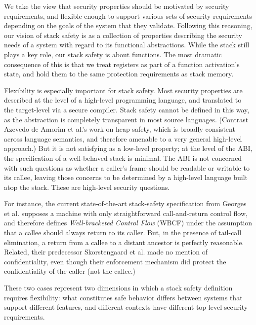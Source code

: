 \documentclass[10pt,conference]{ieeetran}%
\theoremstyle{definition}
\begin{document}
We take the view that security properties should be motivated by security requirements,
and flexible enough to support various sets of security requirements depending on the
goals of the system that they validate.
Following this reasoning, our vision of stack safety is as a collection of properties
describing the security needs of a system with regard to its functional abstractions.
While the stack still plays a key role, our stack safety is about functions. The most
dramatic consequence of this is that we treat registers as part of a function activation's
state, and hold them to the same protection requirements as stack memory.

Flexibility is especially important for stack safety.
%
Most security properties are described at the level of a high-level programming language,
and translated to the target-level via a secure compiler. Stack safety cannot
be defined in this way, as the abstraction is completely transparent in most source languages.
(Contrast Azevedo de Amorim et al.'s \cite{DBLP:conf/post/AmorimHP18} work on heap safety,
which is broadly consistent across language semantics, and therefore
amenable to a very general high-level approach.)
%
But it is not satisfying as a low-level property; at the level of the ABI, the
specification of a well-behaved stack is minimal. The ABI is not concerned with such
questions as whether a caller's frame should be readable or writable to its callee,
leaving those concerns to be determined by a high-level language built atop the stack.
These are high-level security questions.

For instance, the current state-of-the-art stack-safety specification from Georges et al.
\cite{Georges22:TempsDesCerises} supposes a machine with only straightforward call-and-return
control flow, and therefore defines {\em Well-bracketed Control Flow} (WBCF) under the assumption that
a callee should always return to its caller. But, in the presence of tail-call elimination, a
return from a callee to a distant ancestor is perfectly reasonable. Related, their predecessor
Skorstengaard et al. \cite{SkorstengaardSTKJFP} made no mention of confidentiality, even though
their enforcement mechanism did protect the confidentiality of the caller (not the callee.)

These two cases represent two dimensions in which a stack safety definition requires
flexibility: what constitutes safe behavior differs between systems that support different
features, and different contexts have different top-level security requirements.
\end{document}
